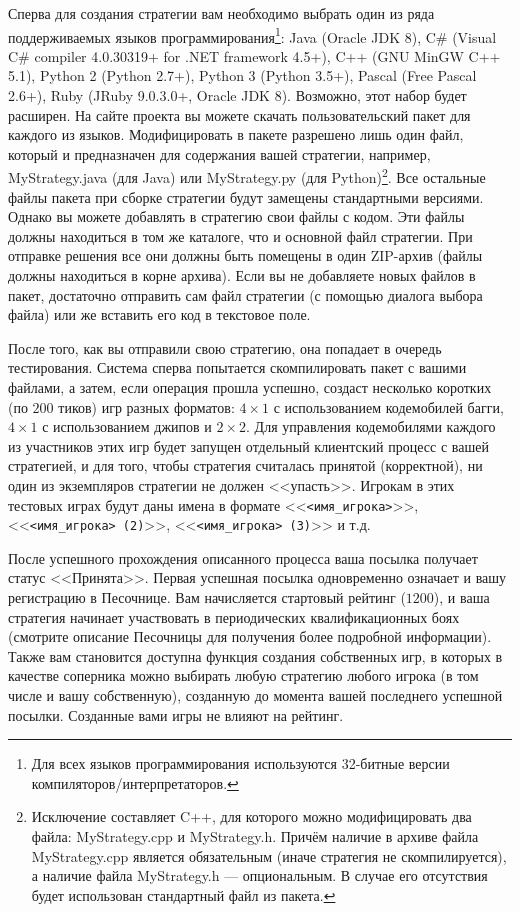 Сперва для создания стратегии вам необходимо выбрать один из ряда поддерживаемых языков программирования\footnote[3]{Для всех языков
программирования используются 32-битные версии компиляторов/интерпретаторов.}: Java (Oracle JDK 8), C\# (Visual C\# compiler 4.0.30319+ for
.NET framework 4.5+), C++ (GNU MinGW C++ 5.1), Python 2 (Python 2.7+), Python 3 (Python 3.5+), Pascal (Free Pascal 2.6+), Ruby (JRuby
9.0.3.0+, Oracle JDK 8). Возможно, этот набор будет расширен. На сайте проекта вы можете скачать пользовательский пакет для каждого из
языков. Модифицировать в пакете разрешено лишь один файл, который и предназначен для содержания вашей стратегии, например, MyStrategy.java
(для Java) или MyStrategy.py (для Python)\footnote[4]{Исключение составляет C++, для которого можно модифицировать два файла: MyStrategy.cpp
и MyStrategy.h. Причём наличие в архиве файла MyStrategy.cpp является обязательным (иначе стратегия не скомпилируется), а наличие файла
MyStrategy.h --- опциональным. В случае его отсутствия будет использован стандартный файл из пакета.}. Все остальные файлы пакета при сборке
стратегии будут замещены стандартными версиями. Однако вы можете добавлять в стратегию свои файлы с кодом. Эти файлы должны находиться в том
же каталоге, что и основной файл стратегии. При отправке решения все они должны быть помещены в один ZIP-архив (файлы должны находиться в
корне архива). Если вы не добавляете новых файлов в пакет, достаточно отправить сам файл стратегии (с помощью диалога выбора файла) или же
вставить его код в текстовое поле.

После того, как вы отправили свою стратегию, она попадает в очередь тестирования. Система сперва попытается скомпилировать пакет с вашими
файлами, а затем, если операция прошла успешно, создаст несколько коротких (по $200$ тиков) игр разных форматов: $4\times1$ с использованием
кодемобилей багги, $4\times1$ с использованием джипов и $2\times2$. Для управления кодемобилями каждого из участников этих игр будет запущен
отдельный клиентский процесс с вашей стратегией, и для того, чтобы стратегия считалась принятой (корректной), ни один из экземпляров
стратегии не должен <<упасть>>. Игрокам в этих тестовых играх будут даны имена в формате <<\texttt{<имя\_игрока>}>>,
<<\texttt{<имя\_игрока> (2)}>>, <<\texttt{<имя\_игрока> (3)}>> и т.д.

После успешного прохождения описанного процесса ваша посылка получает статус <<Принята>>. Первая успешная посылка одновременно означает и
вашу регистрацию в Песочнице. Вам начисляется стартовый рейтинг ($1200$), и ваша стратегия начинает участвовать в периодических
квалификационных боях (смотрите описание Песочницы для получения более подробной информации). Также вам становится доступна функция создания
собственных игр, в которых в качестве соперника можно выбирать любую стратегию любого игрока (в том числе и вашу собственную), созданную до
момента вашей последнего успешной посылки. Созданные вами игры не влияют на рейтинг.

